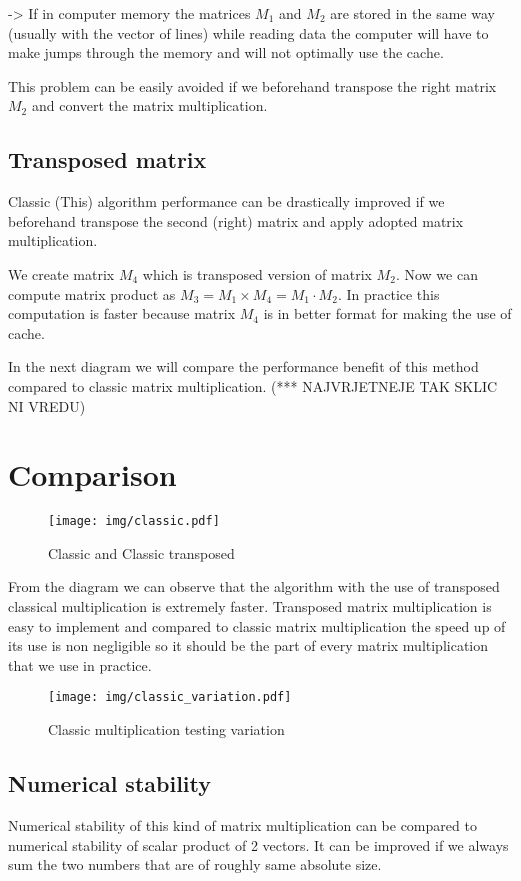\documentclass[a4paper,11pt]{article}
\begin{document}
->
If in computer memory the matrices $M_{1}$ and $M_{2}$ are stored in the same 
way (usually with the vector of lines) while reading data the computer will 
have to make jumps through the memory and will not optimally use the cache. 

This problem can be easily avoided if we beforehand transpose the right matrix $M_{2}$ 
and convert the matrix multiplication.



\subsection{Transposed matrix}

Classic (This) algorithm performance can be drastically improved if we beforehand 
transpose the second (right) matrix and apply adopted matrix multiplication. 

We create matrix $M_{4}$ which is transposed version of matrix $M_{2}$. 
Now we can compute matrix product as $M_{3} = M_{1} \times M_{4} = M_{1} \cdot M_{2}$. 
In practice this computation is faster because matrix $M_{4}$ is in better format 
for making the use of cache.

In the next diagram we will compare the performance benefit of this method compared 
to classic matrix multiplication. (*** NAJVRJETNEJE TAK SKLIC NI VREDU)

\section{Comparison}
\begin{figure}[h]
\centering
\texttt{[image: img/classic.pdf]}
\caption{Classic and Classic transposed}
\label{fig:classic}
\end{figure}

From the diagram we can observe that the algorithm with the use of transposed 
classical multiplication is extremely faster. 
Transposed matrix multiplication is easy to implement and compared to classic 
matrix multiplication the speed up of its use is non negligible so it should 
be the part of every matrix multiplication that we use in practice.

\begin{figure}[h]
\centering
\texttt{[image: img/classic\_variation.pdf]}
\caption{Classic multiplication testing variation}
\label{fig:classic}
\end{figure}

\subsection{Numerical stability}
Numerical stability of this kind of matrix multiplication can be compared 
to numerical stability of scalar product of 2 vectors. 
It can be improved if we always sum the two numbers that are of 
roughly same absolute size. 
\end{document}
